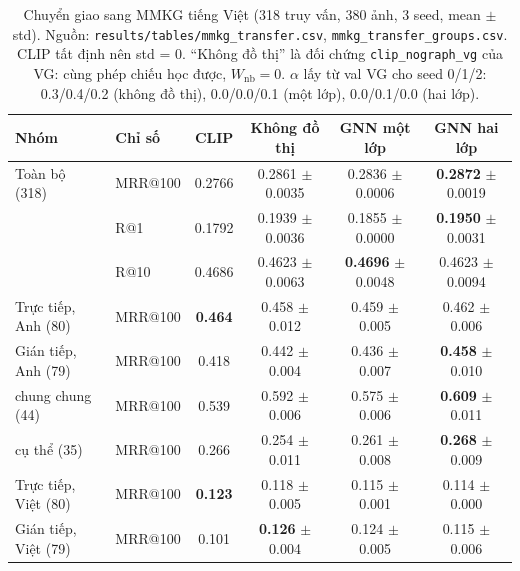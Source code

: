 \documentclass[12pt, a4paper]{article}
\makeatletter
\newcommand{\code}[1]{\texttt{#1}}
\newcommand{\mrr}{MRR@100}
\newcommand{\pmm}{\ensuremath{\pm}}
\makeatother
\begin{document}
\begin{table}[H]
\centering\small
\caption{Chuyển giao sang MMKG tiếng Việt (318 truy vấn, 380 ảnh, 3 seed, mean \pmm{} std). Nguồn: \code{results/tables/mmkg\_transfer.csv}, \code{mmkg\_transfer\_groups.csv}. CLIP tất định nên std = 0. ``Không đồ thị'' là đối chứng \code{clip\_nograph\_vg} của VG: cùng phép chiếu học được, $W_{\text{nb}}=0$. $\alpha$ lấy từ val VG cho seed 0/1/2: 0.3/0.4/0.2 (không đồ thị), 0.0/0.0/0.1 (một lớp), 0.0/0.1/0.0 (hai lớp).}
\label{tab:mmkg}
\footnotesize\setlength{\tabcolsep}{3pt}
\begin{tabular}{l l c c c c}
\toprule
\textbf{Nhóm} & \textbf{Chỉ số} & \textbf{CLIP} & \textbf{Không đồ thị} & \textbf{GNN một lớp} & \textbf{GNN hai lớp} \\
\midrule
Toàn bộ (318) & \mrr{} & 0.2766 & 0.2861 \pmm{} 0.0035 & 0.2836 \pmm{} 0.0006 & \textbf{0.2872} \pmm{} 0.0019 \\
 & R@1 & 0.1792 & 0.1939 \pmm{} 0.0036 & 0.1855 \pmm{} 0.0000 & \textbf{0.1950} \pmm{} 0.0031 \\
 & R@10 & 0.4686 & 0.4623 \pmm{} 0.0063 & \textbf{0.4696} \pmm{} 0.0048 & 0.4623 \pmm{} 0.0094 \\
\midrule
Trực tiếp, Anh (80) & \mrr{} & \textbf{0.464} & 0.458 \pmm{} 0.012 & 0.459 \pmm{} 0.005 & 0.462 \pmm{} 0.006 \\
Gián tiếp, Anh (79) & \mrr{} & 0.418 & 0.442 \pmm{} 0.004 & 0.436 \pmm{} 0.007 & \textbf{0.458} \pmm{} 0.010 \\
\quad chung chung (44) & \mrr{} & 0.539 & 0.592 \pmm{} 0.006 & 0.575 \pmm{} 0.006 & \textbf{0.609} \pmm{} 0.011 \\
\quad cụ thể (35) & \mrr{} & 0.266 & 0.254 \pmm{} 0.011 & 0.261 \pmm{} 0.008 & \textbf{0.268} \pmm{} 0.009 \\
Trực tiếp, Việt (80) & \mrr{} & \textbf{0.123} & 0.118 \pmm{} 0.005 & 0.115 \pmm{} 0.001 & 0.114 \pmm{} 0.000 \\
Gián tiếp, Việt (79) & \mrr{} & 0.101 & \textbf{0.126} \pmm{} 0.004 & 0.124 \pmm{} 0.005 & 0.115 \pmm{} 0.006 \\
\bottomrule
\end{tabular}
\end{table}
\end{document}
